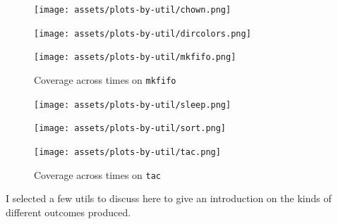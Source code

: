 \documentclass{article}
\begin{document}
\begin{figure}[htbp]
    \centering
    \begin{minipage}[b]{0.3\linewidth}
        \texttt{[image: assets/plots-by-util/chown.png]}
        \captionsetup{width=0.9\linewidth}
        \caption{Coverage across times on \lstinline{chown}}
        \label{fig:cov_chown}
    \end{minipage}
    \hfill
    \begin{minipage}[b]{0.3\linewidth}
        \texttt{[image: assets/plots-by-util/dircolors.png]}
        \captionsetup{width=0.9\linewidth}
        \caption{Coverage across times on \lstinline{dircolors}}
        \label{fig:cov_dircolors}
    \end{minipage}
    \hfill
    \begin {minipage}[b]{0.3\linewidth}
    \texttt{[image: assets/plots-by-util/mkfifo.png]}
    \captionsetup{width=0.9\linewidth}
    \caption{Coverage across times on \lstinline{mkfifo}}
    \label{fig:cov_mkfifo}
    \end{minipage}
\end{figure}

\begin{figure}[htbp]
    \centering
    \begin {minipage}[b]{0.3\linewidth}
    \texttt{[image: assets/plots-by-util/sleep.png]}
    \captionsetup{width=0.9\linewidth}
    \caption{Coverage across times on \lstinline{sleep}}
    \label{fig:cov_sleep}
    \end{minipage}
    \hfill
    \begin {minipage}[b]{0.3\linewidth}
    \texttt{[image: assets/plots-by-util/sort.png]}
    \captionsetup{width=0.9\linewidth}
    \caption{Coverage across times on \lstinline{sort}}
    \label{fig:cov_sort}
    \end{minipage}
    \hfill
    \begin {minipage}[b]{0.3\linewidth}
    \texttt{[image: assets/plots-by-util/tac.png]}
    \captionsetup{width=0.9\linewidth}
    \caption{Coverage across times on \lstinline{tac}}
    \label{fig:cov_tac}
    \end{minipage}
\end{figure}

I selected a few utils to discuss here to give an introduction on the kinds of different outcomes produced.
\end{document}
